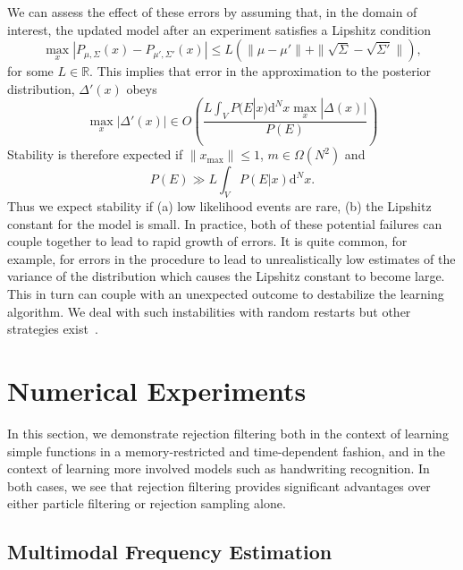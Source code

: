\documentclass[twoside]{article}
\begin{document}
We can assess the effect of these errors by assuming that, in the domain of interest, the updated model after an experiment satisfies a Lipshitz condition
\begin{equation}
\max_x|P_{\mu,\Sigma}(x) - P_{\mu' ,\Sigma'}(x)| \le L(\|\mu- \mu'\| +\|\sqrt{\Sigma}- \sqrt{\Sigma'}\|),
\end{equation}
for some $L\in \mathbb{R}$.  This implies that error in the approximation to the posterior distribution, $\Delta'(x)$ obeys
\begin{equation}
\max_x |\Delta'(x)| \in O\left( \frac{L\int_V P(E|x) \mathrm{d}^Nx \max_x |\Delta(x)|}{P(E)}\right)
\end{equation}
Stability is therefore expected if $\|x_{\max}\|\le 1$, $m\in \Omega(N^2)$ and
\begin{equation}
P(E) \gg {L\int_V P(E|x) \mathrm{d}^Nx }.
\end{equation}
Thus we expect stability if (a) low likelihood events are rare, (b) the Lipshitz constant for the model is small.  In practice, both of these potential failures can couple together to lead to rapid growth of errors.  It is quite common, for example, for errors in the procedure to lead to unrealistically low estimates of the variance of the distribution which causes the Lipshitz constant to become large.  This in turn can couple with an unexpected outcome to destabilize the learning algorithm.  We deal with such instabilities with random restarts but other strategies exist~\cite{wiebe_efficient_2015}.

\section{Numerical Experiments}
\label{sec:numerical-experiments}

In this section, we demonstrate rejection filtering both in the context of
learning simple functions in a memory-restricted and time-dependent fashion,
and in the context of learning more involved models such as handwriting
recognition. In both cases, we see that rejection filtering provides significant
advantages over either particle filtering or rejection sampling alone.

\subsection{Multimodal Frequency Estimation}
\end{document}
